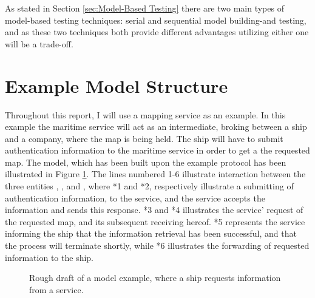 As stated in Section \ref{sec:Model-Based Testing} there are two main types of model-based testing techniques: serial and sequential model building-and testing, and as these two techniques both provide different advantages utilizing either one will be a trade-off.

\section{Example Model Structure}
Throughout this report, I will use a mapping service as an example. In this example the maritime service will act as an intermediate, broking between a ship and a company, where the map is being held. The ship will have to submit authentication information to the maritime service in order to get a the requested map. The model, which has been built upon the example protocol has been illustrated in Figure \ref{fig:modelExProtocol}. The lines numbered 1-6 illustrate interaction between the three entities , , and , where *1 and *2, respectively illustrate a submitting of authentication information, to the service, and the service accepts the information and sends this response. *3 and *4 illustrates the service' request of the requested map, and its subsequent receiving hereof. *5 represents the service informing the ship that the information retrieval has been successful, and that the process will terminate shortly, while *6 illustrates the forwarding of requested information to the ship.

\begin{figure}[h]
	\centering
	\caption{Rough draft of a model example, where a ship requests information from a service.}
	\label{fig:modelExProtocol}
\end{figure}

